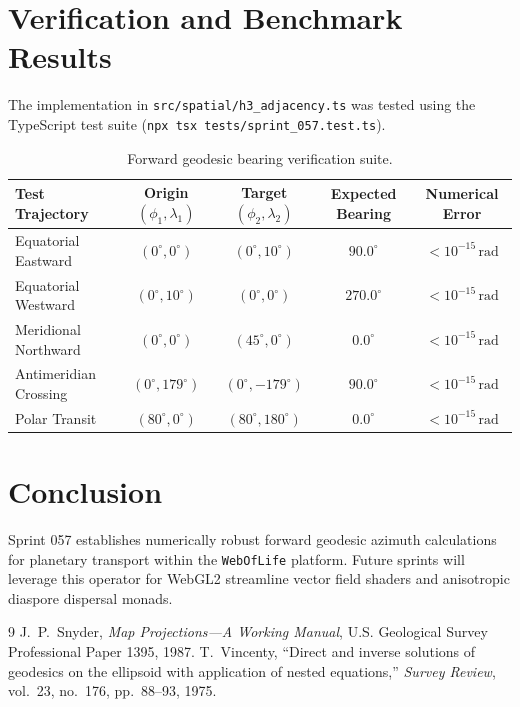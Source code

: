 \documentclass[11pt,a4paper]{article}
\begin{document}
\section{Verification and Benchmark Results}
The implementation in \texttt{src/spatial/h3\_adjacency.ts} was tested using the TypeScript test suite (\texttt{npx tsx tests/sprint\_057.test.ts}).
\begin{table}[h!]
\centering
\small
\begin{tabular}{@{}lcccc@{}}
\toprule
\textbf{Test Trajectory} & \textbf{Origin $(\phi_1, \lambda_1)$} & \textbf{Target $(\phi_2, \lambda_2)$} & \textbf{Expected Bearing} & \textbf{Numerical Error} \\
\midrule
Equatorial Eastward & $(0^\circ, 0^\circ)$ & $(0^\circ, 10^\circ)$ & $90.0^\circ$ & $< 10^{-15}\,\text{rad}$ \\
Equatorial Westward & $(0^\circ, 10^\circ)$ & $(0^\circ, 0^\circ)$ & $270.0^\circ$ & $< 10^{-15}\,\text{rad}$ \\
Meridional Northward & $(0^\circ, 0^\circ)$ & $(45^\circ, 0^\circ)$ & $0.0^\circ$ & $< 10^{-15}\,\text{rad}$ \\
Antimeridian Crossing & $(0^\circ, 179^\circ)$ & $(0^\circ, -179^\circ)$ & $90.0^\circ$ & $< 10^{-15}\,\text{rad}$ \\
Polar Transit & $(80^\circ, 0^\circ)$ & $(80^\circ, 180^\circ)$ & $0.0^\circ$ & $< 10^{-15}\,\text{rad}$ \\
\bottomrule
\end{tabular}
\caption{Forward geodesic bearing verification suite.}
\end{table}

\section{Conclusion}
Sprint 057 establishes numerically robust forward geodesic azimuth calculations for planetary transport within the \texttt{WebOfLife} platform. Future sprints will leverage this operator for WebGL2 streamline vector field shaders and anisotropic diaspore dispersal monads.

\begin{thebibliography}{9}
J.~P.~Snyder, \emph{Map Projections---A Working Manual}, U.S. Geological Survey Professional Paper 1395, 1987.
T.~Vincenty, ``Direct and inverse solutions of geodesics on the ellipsoid with application of nested equations,'' \emph{Survey Review}, vol.~23, no.~176, pp.~88--93, 1975.
\end{thebibliography}
\end{document}

